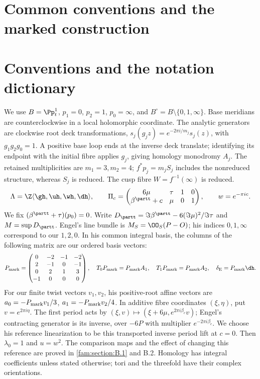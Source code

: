 \section{Common conventions and the marked construction}
\label{def:common-conventions}

\section*{Conventions and the notation dictionary}
We use $B=\Pp^1_t$, $p_1=0$, $p_2=1$, $p_0=\infty$, and
$B^\circ=B\setminus\{0,1,\infty\}$. Base meridians are counterclockwise
in a local holomorphic coordinate. The analytic generators are clockwise
root deck transformations, $s_j(g_jz)=e^{-2\pi i/m_j}s_j(z)$, with
$g_1g_2g_0=1$. A positive base loop ends at the inverse deck translate;
identifying its endpoint with the initial fibre applies $g_j$, giving
homology monodromy $A_j$. The retained multiplicities are $m_1=3,m_2=4$;
$f^*p_j=m_jS_j$ includes the nonreduced structure, whereas $S_j$ is reduced.
The cusp fibre $W=f^{-1}(\infty)$ is reduced.
\[
 \Lambda=\Z\langle\gh,\uh,\wh,\dh\rangle,\qquad
 \Pi_c=\begin{pmatrix}6\mu&\tau&1&0\\\beta^{\partt}+c&\mu&0&1\end{pmatrix},
 \qquad w=e^{-\pi ic}.
\]
We fix $(\beta^{\partt}+\tau)(p_0)=0$. Write
$D_{\partt}=\Im\beta^{\partt}-6(\Im\mu)^2/\Im\tau$ and
$M=\sup D_{\partt}$. Engel's line bundle is
$M_S=\OO_S(P-O)$; his indices $0,1,\infty$ correspond to our $1,2,0$.
In his common integral basis, the columns of the following matrix are
our ordered basis vectors:
\[
 P_{\rm mark}=\begin{pmatrix}
 0&-2&-1&-2\\2&-1&0&-1\\0&2&1&3\\-1&0&0&0
 \end{pmatrix},\quad
 T_0P_{\rm mark}=P_{\rm mark}A_1,\quad
 T_1P_{\rm mark}=P_{\rm mark}A_2,\quad
 \delta_{\rm E}=P_{\rm mark}\dh.
\]
For our finite twist vectors $v_1,v_2$, his positive-root affine vectors
are $a_0=-P_{\rm mark}v_1/3$, $a_1=-P_{\rm mark}v_2/4$.
In additive fibre coordinates $(\xi,\eta)$, put $v=e^{2\pi i\eta}$.
The first period acts by
$(\xi,v)\mapsto(\xi+6\mu,e^{2\pi i\beta_c}v)$; Engel's contracting
generator is its inverse, over $-6P$ with multiplier $e^{-2\pi i\beta_c}$.
We choose his reference linearization to be this transported inverse
period lift at $c=0$. Then $\lambda_0=1$ and $u=w^2$.
The comparison maps and the effect of changing this reference are
proved in \ref{fam:section:B.1} and B.2. Homology has integral coefficients unless stated
otherwise; tori and the threefold have their complex orientations.

